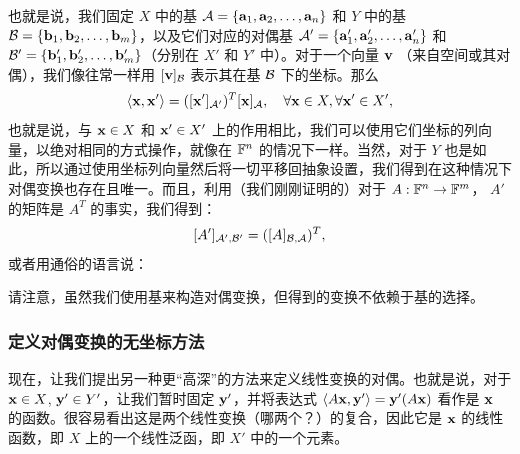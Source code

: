 也就是说，我们固定 $X$ 中的基 $\mathcal{A} = \{\mathbf{a}_1, \mathbf{a}_2, \dots, \mathbf{a}_n\}$ 和 $Y$ 中的基 $\mathcal{B} = \{\mathbf{b}_1, \mathbf{b}_2, \dots, \mathbf{b}_m\}$，以及它们对应的对偶基 $\mathcal{A}' = \{\mathbf{a}'_1, \mathbf{a}'_2, \dots, \mathbf{a}'_n\}$ 和 $\mathcal{B}' = \{\mathbf{b}'_1, \mathbf{b}'_2, \dots, \mathbf{b}'_m\}$（分别在 $X'$ 和 $Y'$ 中）。对于一个向量 $\mathbf{v}$ （来自空间或其对偶），我们像往常一样用 $[\mathbf{v}]_{\mathcal{B}}$ 表示其在基 $\mathcal{B}$ 下的坐标。那么
$$ \langle \mathbf{x}, \mathbf{x}' \rangle = ([\mathbf{x}']_{\mathcal{A}'})^T [\mathbf{x}]_{\mathcal{A}}, \quad \forall \mathbf{x} \in X, \forall \mathbf{x}' \in X' ,$$
也就是说，与 $\mathbf{x} \in X$ 和 $\mathbf{x}' \in X'$ 上的作用相比，我们可以使用它们坐标的列向量，以绝对相同的方式操作，就像在 $\mathbb{F}^n$ 的情况下一样。当然，对于 $Y$ 也是如此，所以通过使用坐标列向量然后将一切平移回抽象设置，我们得到在这种情况下对偶变换也存在且唯一。而且，利用（我们刚刚证明的）对于 $A : \mathbb{F}^n \to \mathbb{F}^m$， $A'$ 的矩阵是 $A^T$ 的事实，我们得到：
\begin{equation}\label{eq:08-03-01}
[A']_{\mathcal{A}', \mathcal{B}'} = ([A]_{\mathcal{B}, \mathcal{A}})^T,
\end{equation}
或者用通俗的语言说：



\begin{remark}\label{stmt:08-03-02}
请注意，虽然我们使用基来构造对偶变换，但得到的变换不依赖于基的选择。
\end{remark}

\subsubsection{定义对偶变换的无坐标方法}\label{sec:08-03-01-03}

现在，让我们提出另一种更“高深”的方法来定义线性变换的对偶。也就是说，对于 $\mathbf{x} \in X$, $\mathbf{y}' \in Y'$，让我们暂时固定 $\mathbf{y}'$，并将表达式 $\langle A\mathbf{x}, \mathbf{y}' \rangle = \mathbf{y}'(A\mathbf{x})$ 看作是 $\mathbf{x}$ 的函数。很容易看出这是两个线性变换（哪两个？）的复合，因此它是 $\mathbf{x}$ 的线性函数，即 $X$ 上的一个线性泛函，即 $X'$ 中的一个元素。

